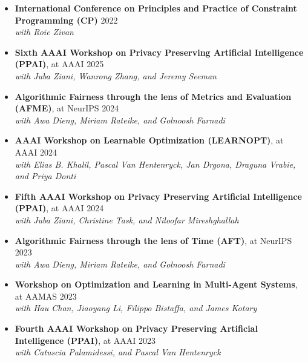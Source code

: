 
\begin{itemize}    
    \item {\bf International Conference on Principles and Practice of Constraint Programming (CP)}  \hfill{2022} \\
    {\em with Roie Zivan}
\end{itemize}

  \begin{itemize}
    \item 
    {\bf Sixth AAAI Workshop on Privacy Preserving Artificial Intelligence (PPAI)}, at AAAI   \hfill{2025}
    \\{\em with Juba Ziani, Wanrong Zhang, and Jeremy Seeman}

    \item
    {\bf Algorithmic Fairness through the lens of Metrics and Evaluation (AFME)}, at NeurIPS \hfill {2024}
    \\{\em with Awa Dieng, Miriam Rateike, and Golnoosh Farnadi}

    \item 
    {\bf AAAI Workshop on Learnable Optimization (LEARNOPT)}, at AAAI   \hfill{2024}
    \\{\em with Elias B. Khalil, Pascal Van Hentenryck, Jan Drgona, Draguna Vrabie, and Priya Donti}

    \item 
    {\bf Fifth AAAI Workshop on Privacy Preserving Artificial Intelligence (PPAI)}, at AAAI   \hfill{2024}
    \\{\em with Juba Ziani, Christine Task, and Niloofar Mireshghallah}

    \item
    {\bf Algorithmic Fairness through the lens of Time (AFT)}, at NeurIPS \hfill {2023}
    \\{\em with Awa Dieng, Miriam Rateike, and Golnoosh Farnadi}

    \item 
    {\bf Workshop on Optimization and Learning in Multi-Agent Systems}, at AAMAS \hfill{2023}
    \\{\em with Hau Chan, Jiaoyang Li, Filippo Bistaffa, and James Kotary}

    \item 
    {\bf Fourth AAAI Workshop on Privacy Preserving Artificial Intelligence (PPAI)}, at AAAI   \hfill{2023}
    \\{\em with Catuscia Palamidessi, and Pascal Van Hentenryck}


\end{itemize}
